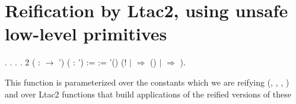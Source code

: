 \begin{coqdoccode}
\end{coqdoccode}
\section{Reification by Ltac2, using unsafe low-level primitives}

\begin{coqdoccode}
\coqdocnoindent
{}  .\coqdoceol
\coqdocnoindent
{}  .\coqdoceol
\coqdocnoindent
{} .\coqdoceol
\coqdocnoindent
{} .\coqdoceol
\coqdocemptyline
\coqdocnoindent
{}2  ( :  \ensuremath{\rightarrow} ') ( : ') :=\coqdoceol
\coqdocindent{1.00em}
  := '() \coqdoceol
\coqdocindent{1.00em}
(!  \coqdoceol
\coqdocindent{1.00em}
\ensuremath{|}  \ensuremath{\Rightarrow}  ()\coqdoceol
\coqdocindent{1.00em}
\ensuremath{|}  \ensuremath{\Rightarrow} \coqdoceol
\coqdocindent{1.00em}
).\coqdoceol
\coqdocemptyline
\end{coqdoccode}
This function is parameterized over the constants which we are
    reifying (, , , ) and over Ltac2
    functions that build applications of the reified versions of these

